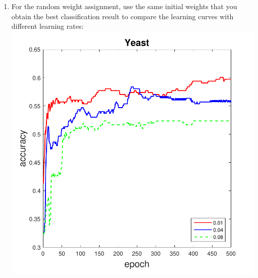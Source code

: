 \documentclass[12pt,a4paper]{article}
\begin{document}
\begin{CJK}{UTF8}{bsmi}
\begin{enumerate}
\begin{enumerate}
	\item For the random weight assignment, use the same initial weights that you obtain the best classification result to compare the learning curves with different learning rates:
	\\
	\includegraphics[scale=0.7]{yeastcurve}
	

\end{enumerate}
\end{enumerate}
\end{CJK}
\end{document}

